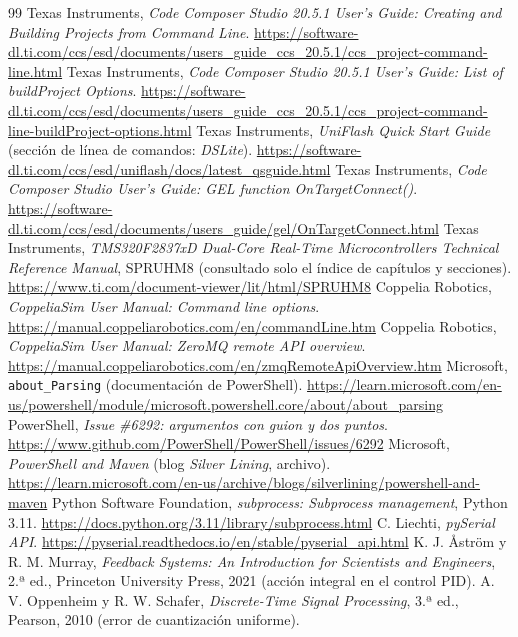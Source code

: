 \documentclass[12pt,letterpaper]{article}
\begin{document}
\begin{thebibliography}{99}
 Texas Instruments, \textit{Code Composer Studio 20.5.1 User's Guide: Creating and Building Projects from Command Line}. \url{https://software-dl.ti.com/ccs/esd/documents/users_guide_ccs_20.5.1/ccs_project-command-line.html}
 Texas Instruments, \textit{Code Composer Studio 20.5.1 User's Guide: List of buildProject Options}. \url{https://software-dl.ti.com/ccs/esd/documents/users_guide_ccs_20.5.1/ccs_project-command-line-buildProject-options.html}
 Texas Instruments, \textit{UniFlash Quick Start Guide} (sección de línea de comandos: \textit{DSLite}). \url{https://software-dl.ti.com/ccs/esd/uniflash/docs/latest_qsguide.html}
 Texas Instruments, \textit{Code Composer Studio User's Guide: GEL function OnTargetConnect()}. \url{https://software-dl.ti.com/ccs/esd/documents/users_guide/gel/OnTargetConnect.html}
 Texas Instruments, \textit{TMS320F2837xD Dual-Core Real-Time Microcontrollers Technical Reference Manual}, SPRUHM8 (consultado solo el índice de capítulos y secciones). \url{https://www.ti.com/document-viewer/lit/html/SPRUHM8}
 Coppelia Robotics, \textit{CoppeliaSim User Manual: Command line options}. \url{https://manual.coppeliarobotics.com/en/commandLine.htm}
 Coppelia Robotics, \textit{CoppeliaSim User Manual: ZeroMQ remote API overview}. \url{https://manual.coppeliarobotics.com/en/zmqRemoteApiOverview.htm}
 Microsoft, \texttt{about\_Parsing} (documentación de PowerShell). \url{https://learn.microsoft.com/en-us/powershell/module/microsoft.powershell.core/about/about_parsing}
 PowerShell, \textit{Issue \#6292: argumentos con guion y dos puntos}. \url{https://www.github.com/PowerShell/PowerShell/issues/6292}
 Microsoft, \textit{PowerShell and Maven} (blog \textit{Silver Lining}, archivo). \url{https://learn.microsoft.com/en-us/archive/blogs/silverlining/powershell-and-maven}
 Python Software Foundation, \textit{subprocess: Subprocess management}, Python 3.11. \url{https://docs.python.org/3.11/library/subprocess.html}
 C. Liechti, \textit{pySerial API}. \url{https://pyserial.readthedocs.io/en/stable/pyserial_api.html}
 K. J. Åström y R. M. Murray, \textit{Feedback Systems: An Introduction for Scientists and Engineers}, 2.ª ed., Princeton University Press, 2021 (acción integral en el control PID).
 A. V. Oppenheim y R. W. Schafer, \textit{Discrete-Time Signal Processing}, 3.ª ed., Pearson, 2010 (error de cuantización uniforme).
\end{thebibliography}
\end{document}
